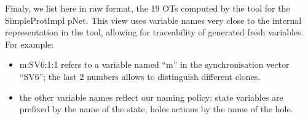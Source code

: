 
Finaly, we list here in raw format, the 19 OTs computed by the tool for the SimpleProtImpl pNet.
This view uses variable names very close to the internal representation in the tool, allowing for traceability of generated fresh variables. For example:
\begin{itemize}
\item m:SV6:1:1 refers to a variable named ``m'' in the synchronisation vector ``SV6''; the last 2 numbers allows to distinguish different clones.
\item the other variable names reflect our naming policy: state variables are prefixed by the name of the state, holes actions by the name of the hole.
\end{itemize}


